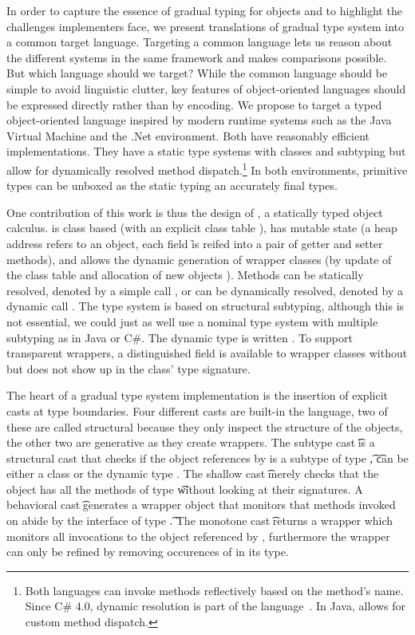 \documentclass[a4paper,USenglish]{tex/lipics-v2016}
\begin{document}
In order to capture the essence of gradual typing for objects and to
highlight the challenges implementers face, we present translations of
gradual type system into a common target language. Targeting a common
language lets us reason about the different systems in the same framework
and makes comparisons possible. But which language should we target?  While
the common language should be simple to avoid linguistic clutter, key
features of object-oriented languages should be expressed directly rather
than by encoding. We propose to target a typed object-oriented language
inspired by modern runtime systems such as the Java Virtual Machine and the
.Net environment.  Both have reasonably efficient implementations. They have
a static type systems with classes and subtyping but allow for dynamically
resolved method dispatch.\footnote{Both languages can invoke methods
  reflectively based on the method's name. Since C\# 4.0, dynamic resolution
  is part of the language~\cite{BAT14}. In Java,  allows
  for custom method dispatch.} In both environments, primitive types can be
unboxed as the static typing an accurately final types.

One contribution of this work is thus the design of \kafka, a statically
typed object calculus.  \kafka is class based (with an explicit class table
\K), has mutable state (a heap address \a refers to an object, each field \f
is reifed into a pair of getter and setter methods), and allows the dynamic
generation of wrapper classes (by update of the class table \K and
allocation of new objects \a).  Methods can be statically resolved, denoted
by a simple call \Call\a\m\x, or can be dynamically resolved, denoted by a
dynamic call \DynCall\a\m\x. The \kafka type system is based on structural
subtyping, although this is not essential, we could just as well use a
nominal type system with multiple subtyping as in Java or C\#.  The dynamic
type is written \any. To support transparent wrappers, a distinguished \that
field is available to wrapper classes without but does not show up in the
class' type signature.

The heart of a gradual type system implementation is the insertion of
explicit casts at type boundaries.  Four different casts are built-in the
language, two of these are called structural because they only inspect the
structure of the objects, the other two are generative as they create
wrappers.  The subtype cast \SubCast\t\a is a structural cast that checks if
the object references by \a is a subtype of type \t, \t can be either a
class \C or the dynamic type \any.  The shallow cast \ShaCast\t\a merely
checks that the object has all the methods of type \t without looking at
their signatures. A behavioral cast \BehCast\t\a generates a wrapper object
that monitors that methods invoked on \a abide by the interface of type
\t. The monotone cast \MonCast\t\a returns a wrapper which monitors all
invocations to the object referenced by \a, furthermore the wrapper can only
be refined by removing occurences of \any in its type.
\end{document}
